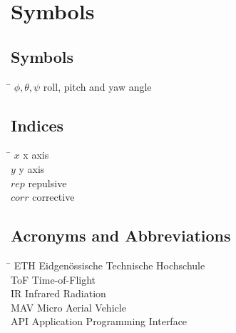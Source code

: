 \chapter*{Symbols}
\label{sec:symbols}

\section*{Symbols}

\begin{tabbing}
 \hspace*{1.6cm} \= \kill
  $\phi, \theta, \psi$    \> roll, pitch and yaw angle \\[0.5ex]
 
   					  		
\end{tabbing}

\section*{Indices}
\begin{tabbing}
 \hspace*{1.6cm}  \= \kill
 $x$ \> x axis \\[0.5ex]
 $y$ \> y axis \\[0.5ex]
 $rep$ \> repulsive \\[0.5ex]
 $corr$ \> corrective \\[0.5ex]
\end{tabbing}

\section*{Acronyms and Abbreviations}
\begin{tabbing}
 \hspace*{1.6cm}  \= \kill
 ETH \> Eidgenössische Technische Hochschule \\[0.5ex]
 ToF \> Time-of-Flight \\[0.5ex]
 IR \> Infrared Radiation \\[0.5ex]
 MAV \> Micro Aerial Vehicle \\[0.5ex] 
 API \> Application Programming Interface
\end{tabbing}